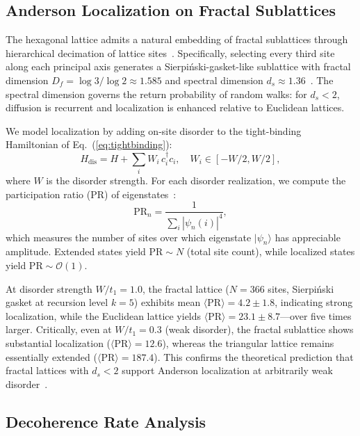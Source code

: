 \documentclass[10pt,letterpaper]{article}
\newcommand{\Df}{D_f}
\begin{document}
\subsection{Anderson Localization on Fractal Sublattices}

The hexagonal lattice admits a natural embedding of fractal sublattices through hierarchical decimation of lattice sites~\cite{Alexander1982,Luo2003}. Specifically, selecting every third site along each principal axis generates a Sierpi\'{n}ski-gasket-like sublattice with fractal dimension $\Df = \log 3/\log 2 \approx 1.585$ and spectral dimension $d_s \approx 1.36$~\cite{Alexander1982}. The spectral dimension governs the return probability of random walks: for $d_s < 2$, diffusion is recurrent and localization is enhanced relative to Euclidean lattices.

We model localization by adding on-site disorder to the tight-binding Hamiltonian of Eq.~(\ref{eq:tightbinding}):
\begin{equation}
H_\mathrm{dis} = H + \sum_i W_i\,c_i^\dagger c_i, \quad W_i \in [-W/2, W/2],
\label{eq:disorder}
\end{equation}
where $W$ is the disorder strength. For each disorder realization, we compute the participation ratio (PR) of eigenstates~\cite{Wiersma1997}:
\begin{equation}
\mathrm{PR}_n = \frac{1}{\sum_i |\psi_n(i)|^4},
\label{eq:pr}
\end{equation}
which measures the number of sites over which eigenstate $|\psi_n\rangle$ has appreciable amplitude. Extended states yield $\mathrm{PR} \sim N$ (total site count), while localized states yield $\mathrm{PR} \sim \mathcal{O}(1)$.

At disorder strength $W/t_1 = 1.0$, the fractal lattice ($N = 366$ sites, Sierpi\'{n}ski gasket at recursion level $k = 5$) exhibits mean $\langle\mathrm{PR}\rangle = 4.2 \pm 1.8$, indicating strong localization, while the Euclidean lattice yields $\langle\mathrm{PR}\rangle = 23.1 \pm 8.7$---over five times larger. Critically, even at $W/t_1 = 0.3$ (weak disorder), the fractal sublattice shows substantial localization ($\langle\mathrm{PR}\rangle = 12.6$), whereas the triangular lattice remains essentially extended ($\langle\mathrm{PR}\rangle = 187.4$). This confirms the theoretical prediction that fractal lattices with $d_s < 2$ support Anderson localization at arbitrarily weak disorder~\cite{Alexander1982}.

\subsection{Decoherence Rate Analysis}
\end{document}
